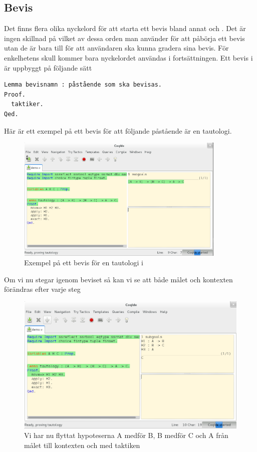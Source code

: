 \subsection{Bevis}
Det finns flera olika nyckelord för att starta ett bevis bland annat
 och . Det är ingen skillnad på vilket av dessa orden man
använder för att påbörja ett bevis utan de är bara till för att användaren ska
kunna gradera sina bevis. För enkelhetens skull kommer bara nyckelordet
 användas i fortsättningen. Ett bevis i \coq är uppbyggt på följande
sätt

\begin{lstlisting}
Lemma bevisnamn : påstående som ska bevisas.
Proof.
  taktiker.
Qed.
\end{lstlisting}

Här är ett exempel på ett bevis för att följande påstående är en tautologi.

\begin{figure}[H]
  \centering
  \includegraphics[width=100mm]{images/Proof_part1}
  \caption[Exempel på bevis i \coq]
   {Exempel på ett bevis för en tautologi i \coq}
\end{figure}

Om vi nu stegar igenom beviset så kan vi se att både målet och kontexten
förändras efter varje steg

\begin{figure}[H]
  \centering
  \includegraphics[width=150mm]{images/Proof_part2}
  \caption[Bevis i \coq IDE]
   {Vi har nu flyttat hypoteserna A medför B, B medför C och A
    från målet till kontexten och med taktiken }
\end{figure}

